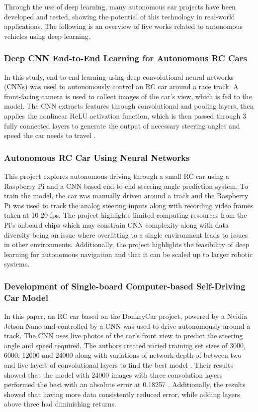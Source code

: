 \documentclass{article} %
\begin{document}
Through the use of deep learning, many autonomous car projects have been developed and tested, showing the potential of this technology in real-world applications. 
The following is an overview of five works related to autonomous vehicles using deep learning.  


\subsubsection{Deep CNN End-to-End Learning for Autonomous RC Cars \citep{bhutta2023deep}}

 
In this study, end-to-end learning using deep convolutional neural networks (CNNs) was used to autonomously control an RC car around a race track. 
A front-facing camera is used to collect images of the car’s view, which is fed to the model. The CNN extracts features through convolutional and pooling layers, 
then applies the nonlinear ReLU activation function, which is then passed through 3 fully connected layers to generate the output of necessary steering angles 
and speed the car needs to travel \citep{bhutta2023deep}.

\subsubsection{Autonomous RC Car Using Neural Networks \citep{Mallik2023}}

This project explores autonomous driving through a small RC car using a Raspberry Pi and a CNN based end-to-end steering angle prediction system. 
To train the model, the car was manually driven around a track and the Raspberry Pi was used to track the analog steering inputs along with recording video frames 
taken at 10-20 fps. The project highlights limited computing resources from the Pi’s onboard chips which may constrain CNN complexity along with data 
diversity being an issue where overfitting to a single environment leads to issues in other environments. Additionally, the project highlights the 
feasibility of deep learning for autonomous navigation and that it can be scaled up to larger robotic systems.

\subsubsection{Development of Single-board Computer-based Self-Driving Car Model \citep{9751873}}

In this paper, an RC car based on the DonkeyCar project, powered by a Nvidia Jetson Nano and controlled by a CNN was used to drive autonomously around a track. The
CNN uses live photos of the car’s front view to predict the steering angle and speed required. The authors created varied training set sizes of 
3000, 6000, 12000 and 24000 along with variations of network depth of between two and five layers of convolutional layers to find the best model \citep{9751873}. 
Their results showed that the model with 24000 images with three convolution layers performed the best with an absolute error at 0.18257 \citep{9751873}. 
Additionally, the results showed that having more data consistently reduced error, while adding layers above three had diminishing returns. 
\end{document}
